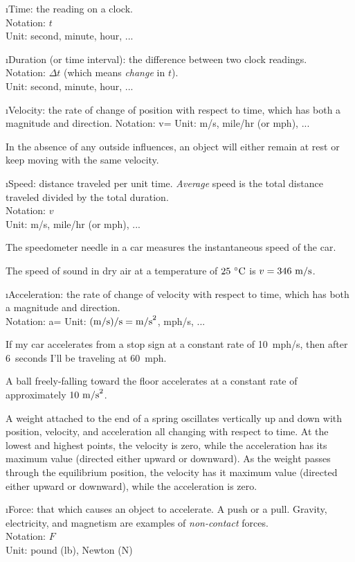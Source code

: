 \i Time: the reading on a clock.
\\
Notation: $t$
\\
Unit: second, minute, hour, ...

\i Duration (or time interval): 
the difference between two clock readings.
\\
Notation: $\Delta t$ (which means {\em change} in $t$).
\\
Unit: second, minute, hour, ...

\i Velocity: 
the rate of change of position with respect to 
time, which has both a magnitude and direction.
Notation:
%
\be
v= 
\ee
%
Unit: m/s, mile/hr (or mph), ...

In the absence of any outside influences, an object will either 
remain at rest or keep moving with the same velocity.

\i Speed: 
distance traveled per unit time. 
{\em Average} speed is the total distance traveled divided by
the total duration.
\\
Notation: $v$ 
\\
Unit: m/s, mile/hr (or mph), ...

\ex The speedometer needle in a car measures the instantaneous 
speed of the car.

\ex The speed of sound in dry air at a temperature of 
$25~{}^\circ{\rm C}$ is $v=346~{\rm m/s}$.

\i Acceleration: 
the rate of change of velocity with respect to 
time, which has both a magnitude and direction.
\\
Notation:
%
\be
a= 
\ee
%
Unit: ${\rm (m/s)/s} = {\rm m/s}^2$, mph/s, ...

\ex If my car accelerates from a stop sign at a 
constant rate of 10~mph/s, then after 6~seconds
I'll be traveling at 60~mph.

\ex A ball freely-falling toward the floor accelerates
at a constant rate of approximately $10~{\rm m/s}^2$.

\ex A weight attached to the end of a spring
oscillates vertically up and down with position, velocity,
and acceleration all changing with respect to time.
At the lowest and highest points, the velocity is zero,
while the acceleration has its maximum value (directed 
either upward or downward).
As the weight passes through the equilibrium position, 
the velocity has it maximum value (directed either upward
or downward), while the acceleration is zero.

\i Force: 
that which causes an object to accelerate.
A push or a pull. 
Gravity, electricity, and magnetism are examples of 
{\em non-contact} forces.
\\
Notation: $F$
\\
Unit: pound (lb), Newton (N)

